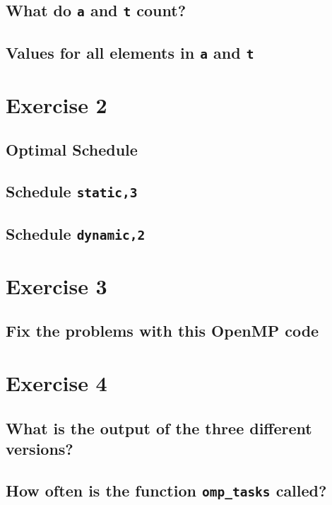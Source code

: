 \documentclass[a4paper,%
11pt,%
DIV12,
headsepline,%
headings=normal,
]{scrartcl}
\begin{document}
\subsection{What do \texttt{a} and \texttt{t} count?}

\subsection{Values for all elements in \texttt{a} and \texttt{t}}

\section{Exercise 2}

\subsection{Optimal Schedule}

\subsection{Schedule \texttt{static,3}}

\subsection{Schedule \texttt{dynamic,2}}

\section{Exercise 3}

\subsection{Fix the problems with this OpenMP code}

\section{Exercise 4}

\subsection{What is the output of the three different versions?}

\subsection{How often is the function \texttt{omp\_tasks} called?}
\end{document}
